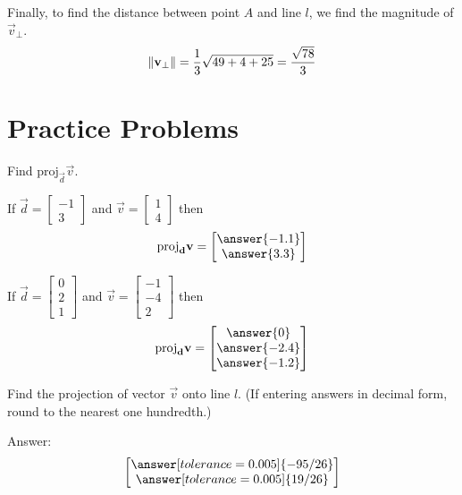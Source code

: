 \documentclass{ximera}
\begin{document}
\begin{example}
\begin{explanation}
Finally, to find the distance between point $A$ and line $l$, we find the magnitude of $\vec{v}_{\perp}$.
$$\left\lVert\mathbf{v}_{\perp}\right\rVert=\frac{1}{3}\sqrt{49+4+25}=\frac{\sqrt{78}}{3}$$
\end{explanation}
\end{example}

\section*{Practice Problems}
\begin{problem}%
Find $\mbox{proj}_{\vec{d}}\vec{v}$.  
  \begin{problem}\label{prob:proj1a}
  If $\vec{d}=\begin{bmatrix}-1\\3\end{bmatrix}$ and $\vec{v}=\begin{bmatrix}1\\4\end{bmatrix}$ then
  $$\mbox{proj}_{\vec{d}}\vec{v}=\begin{bmatrix}\answer{-1.1}\\\answer{3.3}\end{bmatrix}$$
    \end{problem}
    \begin{problem}\label{prob:proj1b}
    If $\vec{d}=\begin{bmatrix}0\\2\\1\end{bmatrix}$ and $\vec{v}=\begin{bmatrix}-1\\-4\\2\end{bmatrix}$ then
    $$\mbox{proj}_{\vec{d}}\vec{v}=\begin{bmatrix}\answer{0}\\\answer{-2.4}\\\answer{-1.2}\end{bmatrix}$$
    \end{problem}
\end{problem}
\begin{problem}\label{prob:proj2}
Find the projection of vector $\vec{v}$ onto line $l$. (If entering answers in decimal form, round to the nearest one hundredth.)

\begin{center}
\end{center}

Answer:
$$\begin{bmatrix}\answer[tolerance=0.005]{-95/26}\\\answer[tolerance=0.005]{19/26}\end{bmatrix}$$
\end{problem}
\end{document}
